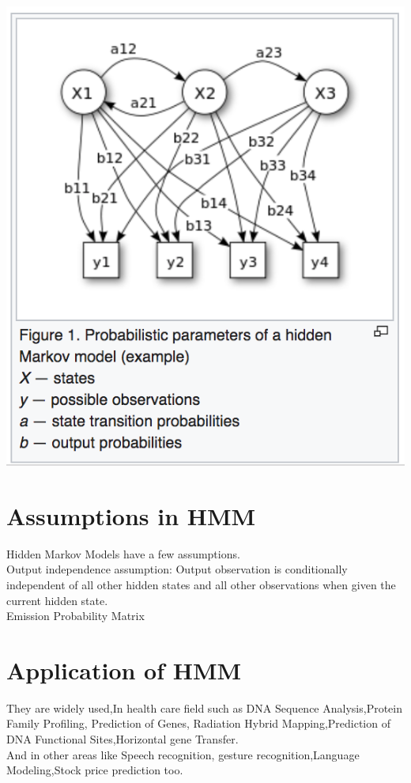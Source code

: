 \documentclass{article}
\begin{document}
\includegraphics[scale=.50]{0_s4wQ8nTIb2122-9s} 

\section{Assumptions in HMM}
Hidden Markov Models have a few assumptions.
\\
Output independence assumption: Output observation is conditionally independent of all other hidden states and all other observations when given the current hidden state.
\\
Emission Probability Matrix 

\section{Application of HMM}
They are widely used,In health care field such as DNA Sequence Analysis,Protein Family Profiling, Prediction of Genes, Radiation Hybrid Mapping,Prediction of DNA Functional Sites,Horizontal gene Transfer.
\\
And in other areas like Speech recognition, gesture recognition,Language Modeling,Stock price  prediction too. 
\end{document}
